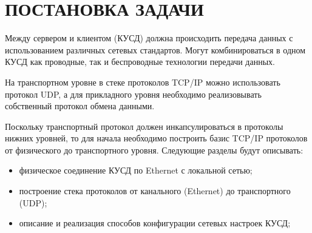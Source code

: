 \newpage

\section{ПОСТАНОВКА ЗАДАЧИ}

Между сервером и клиентом (КУСД) должна происходить передача данных с использованием различных сетевых стандартов. Могут комбинироваться в одном КУСД как проводные, так и беспроводные технологии передачи данных.

На транспортном уровне в стеке протоколов TCP/IP можно использовать протокол UDP, а для прикладного уровня необходимо реализовывать собственный протокол обмена данными. 

Поскольку транспортный протокол должен инкапсулироваться в протоколы нижних уровней, то для начала необходимо построить базис TCP/IP протоколов от физического до транспортного уровня. Следующие разделы будут описывать:
\begin{itemize}
\item физическое соединение КУСД по Ethernet с локальной сетью;
\item построение стека протоколов от канального (Ethernet) до транспортного (UDP);
\item описание и реализация способов конфигурации сетевых настроек КУСД;
\end{itemize}


